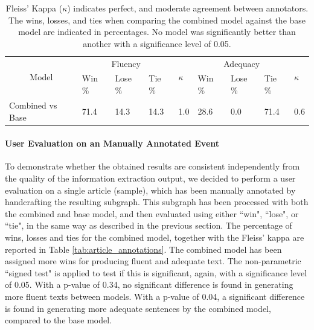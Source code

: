 \documentclass[
hf, %
]{ceurart}
\begin{document}
\begin{table}[ht]
	\caption{Fleiss' Kappa ($\kappa$) indicates perfect, and moderate agreement between annotators. The wins, losses, and ties when comparing the combined model against the base model are indicated in percentages. No model was significantly better than another with a significance level of 0.05.}

	\centering
	\begin{tabular}{|c|lll|l|lll|l|}
		\hline
		\multirow{2}{*}{Model}                 & \multicolumn{3}{c|}{Fluency} & \multirow{2}{*}{$\kappa$}    & \multicolumn{3}{c|}{Adequacy} & \multirow{2}{*}{$\kappa$}                                                                             \\ \cline{2-4} \cline{6-8}
		                                       & \multicolumn{1}{l|}{Win \%}  & \multicolumn{1}{l|}{Lose \%} & Tie \%                        &                           & \multicolumn{1}{l|}{Win \%} & \multicolumn{1}{l|}{Lose \%} & Tie \% &     \\ \hline
		\multicolumn{1}{|l|}{Combined vs Base} & \multicolumn{1}{l|}{71.4}    & \multicolumn{1}{l|}{14.3}    & 14.3                          & 1.0                       & \multicolumn{1}{l|}{28.6}   & \multicolumn{1}{l|}{0.0}     & 71.4   & 0.6 \\ \hline
	\end{tabular}
	\label{tab:event_annotations}
\end{table}

\paragraph*{User Evaluation on an Manually Annotated Event}
\label{sec:result_gen_event}

To demonstrate whether the obtained results are consistent independently from the quality of the information extraction output, we decided to perform a user evaluation on a single article (sample), which has been manually annotated by handcrafting the resulting subgraph. This subgraph has been processed with both the combined and base model, and then evaluated using either ``win", ``lose", or ``tie", in the same way as described in the previous section. The percentage of wins, losses and ties for the combined model, together with the Fleiss' kappa are reported in Table \ref{tab:article_annotations}. The combined model has been assigned more wins for producing fluent and adequate text. The non-parametric ``signed test" is applied to test if this is significant, again, with a significance level of 0.05. With a p-value of 0.34, no significant difference is found in generating more fluent texts between models. With a p-value of 0.04, a significant difference is found in generating more adequate sentences by the combined model, compared to the base model.
\end{document}

